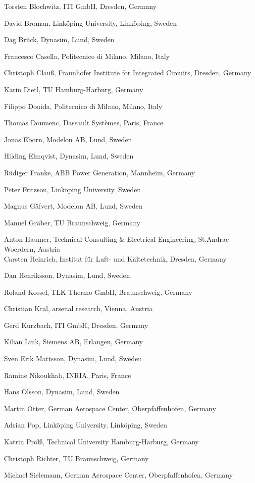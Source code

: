 \documentclass[10pt,a4paper]{report}
\begin{document}
Torsten Blochwitz, ITI GmbH, Dresden, Germany

David Broman, Linköping University, Linköping, Sweden

Dag Brück, Dynasim, Lund, Sweden

Francesco Casella, Politecnico di Milano, Milano, Italy

Christoph Clauß, Fraunhofer Institute for Integrated Circuits, Dresden,
Germany

Karin Dietl, TU Hamburg-Harburg, Germany

Filippo Donida, Politecnico di Milano, Milano, Italy

Thomas Doumenc, Dassault Systèmes, Paris, France

Jonas Eborn, Modelon AB, Lund, Sweden

Hilding Elmqvist, Dynasim, Lund, Sweden

Rüdiger Franke, ABB Power Generation, Mannheim, Germany

Peter Fritzson, Linköping University, Sweden

Magnus Gäfvert, Modelon AB, Lund, Sweden

Manuel Gräber, TU Braunschweig, Germany

Anton Haumer, Technical Consulting \& Electrical Engineering,
St.Andrae-Woerdern, Austria\\
Carsten Heinrich, Institut für Luft- und Kältetechnik, Dresden, Germany

Dan Henriksson, Dynasim, Lund, Sweden

Roland Kossel, TLK Thermo GmbH, Braunschweig, Germany

Christian Kral, arsenal research, Vienna, Austria

Gerd Kurzbach, ITI GmbH, Dresden, Germany

Kilian Link, Siemens AB, Erlangen, Germany

Sven Erik Mattsson, Dynasim, Lund, Sweden

Ramine Nikoukhah, INRIA, Paris, France

Hans Olsson, Dynasim, Lund, Sweden

Martin Otter, German Aerospace Center, Oberpfaffenhofen, Germany

Adrian Pop, Linköping University, Linköping, Sweden

Katrin Prölß, Technical University Hamburg-Harburg, Germany

Christoph Richter, TU Braunschweig, Germany

Michael Sielemann, German Aerospace Center, Oberpfaffenhofen, Germany
\end{document}

